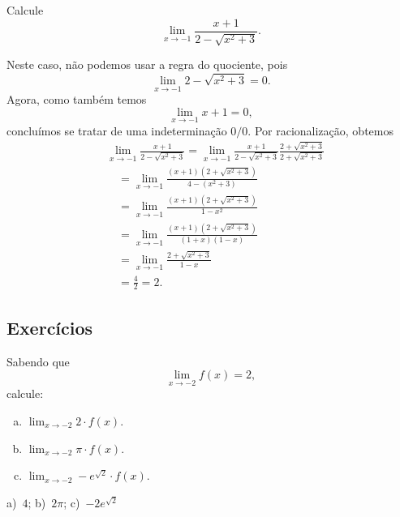 \begin{exeresol}
  Calcule
  \begin{equation}
    \lim_{x\to -1} \frac{x+1}{2-\sqrt{x^2+3}}.
  \end{equation}
\end{exeresol}
\begin{resol}
  Neste caso, não podemos usar a regra do quociente, pois
  \begin{equation}
    \lim_{x\to -1} 2-\sqrt{x^2+3} = 0.
  \end{equation}
  Agora, como também temos
  \begin{equation}
    \lim_{x\to -1} x+1 = 0,
  \end{equation}
  concluímos se tratar de uma indeterminação $0/0$. Por racionalização, obtemos
  \begin{align}
    & \lim_{x\to -1} \frac{x+1}{2-\sqrt{x^2+3}} = \lim_{x\to -1} \frac{x+1}{2-\sqrt{x^2+3}}\frac{2+\sqrt{x^2+3}}{2+\sqrt{x^2+3}} \\
    & \text{}\quad = \lim_{x\to -1} \frac{(x+1)(2+\sqrt{x^2+3})}{4 - (x^2+3)} \\
    & \text{}\quad = \lim_{x\to -1} \frac{(x+1)(2+\sqrt{x^2+3})}{1-x^2} \\
    & \text{}\quad = \lim_{x\to -1} \frac{(x+1)(2+\sqrt{x^2+3})}{(1+x)(1-x)} \\
    & \text{}\quad = \lim_{x\to -1} \frac{2+\sqrt{x^2+3}}{1-x} \\
    & \text{}\quad = \frac{4}{2} = 2.
  \end{align}
\end{resol}

\subsection{Exercícios}

\begin{exer}
  Sabendo que
  \begin{equation}
    \lim_{x\to -2} f(x) = 2,
  \end{equation}
  calcule:
  \begin{enumerate}[a)]
  \item $\displaystyle \lim_{x\to -2} 2\cdot f(x)$.
  \item $\displaystyle \lim_{x\to -2} \pi\cdot f(x)$.
  \item $\displaystyle \lim_{x\to -2} -e^{\sqrt{2}}\cdot f(x)$.
  \end{enumerate}
\end{exer}
\begin{resp}
  a)~$4$; b)~$2\pi$; c)~$-2e^{\sqrt{2}}$
\end{resp}

